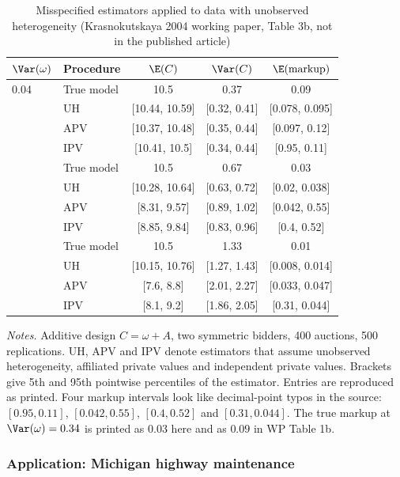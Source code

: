 \begin{table}[htbp]
\centering
\caption{Misspecified estimators applied to data with unobserved heterogeneity (Krasnokutskaya 2004
working paper, Table 3b, not in the published article)}
\label{tab:15-krasno-mc}
\begin{tabular}{llccc}
\toprule
$\Var(\omega)$ & Procedure & $\E(C)$ & $\Var(C)$ & $\E(\text{markup})$\\
\midrule
0.04 & True model & 10.5 & 0.37 & 0.09\\
     & UH  & [10.44, 10.59] & [0.32, 0.41] & [0.078, 0.095]\\
     & APV & [10.37, 10.48] & [0.35, 0.44] & [0.097, 0.12]\\
     & IPV & [10.41, 10.5]  & [0.34, 0.44] & [0.95, 0.11]\\
\addlinespace
0.34 & True model & 10.5 & 0.67 & 0.03\\
     & UH  & [10.28, 10.64] & [0.63, 0.72] & [0.02, 0.038]\\
     & APV & [8.31, 9.57]   & [0.89, 1.02] & [0.042, 0.55]\\
     & IPV & [8.85, 9.84]   & [0.83, 0.96] & [0.4, 0.52]\\
\addlinespace
1    & True model & 10.5 & 1.33 & 0.01\\
     & UH  & [10.15, 10.76] & [1.27, 1.43] & [0.008, 0.014]\\
     & APV & [7.6, 8.8]     & [2.01, 2.27] & [0.033, 0.047]\\
     & IPV & [8.1, 9.2]     & [1.86, 2.05] & [0.31, 0.044]\\
\bottomrule
\end{tabular}

\smallskip
\begin{minipage}{0.93\textwidth}
\footnotesize \textit{Notes.} Additive design $C=\omega+A$, two symmetric bidders, 400 auctions, 500
replications. UH, APV and IPV denote estimators that assume unobserved heterogeneity, affiliated
private values and independent private values. Brackets give 5th and 95th pointwise percentiles of
the estimator. Entries are reproduced as printed. Four markup intervals look like decimal-point
typos in the source: $[0.95,0.11]$, $[0.042,0.55]$, $[0.4,0.52]$ and $[0.31,0.044]$. The true markup
at $\Var(\omega)=0.34$ is printed as $0.03$ here and as $0.09$ in WP Table 1b.
\end{minipage}
\end{table}

\subsubsection{Application: Michigan highway maintenance}

